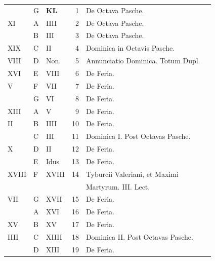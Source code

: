 \begin{center}
\begin{tabular}{l | l | l | r | l l}
\color{Red}  & G & \textbf{\color{Red} K\color{Blue}L} & 1 & \color{Red} De Octava Pasche. & \color{Red} \\
\color{Red} XI & \color{Red} A & \color{Red} IIII & 2 & \color{Red} De Octava Pasche. & \color{Red} \\
\color{Red}  & B & \color{Red} III & 3 & \color{Red} De Octava Pasche. \\
\color{Red} XIX & C & \color{Red} II & 4 & \color{Red} Dominica in Octavis Pasche. \\
\color{Red} VIII & D & \color{Red} Non. & 5 & Annunciatio Dominica. Totum Dupl. \\
\color{Red} XVI & E & \color{Red} VIII & 6 & De Feria. & \color{Red} \\
\color{Red} V & F & \color{Red} VII & 7 & De Feria. & \color{Red} \\
\color{Red}  & G & \color{Red} VI & 8 & De Feria. & \color{Red} \\
\color{Red} XIII & \color{Red} A & \color{Red} V & 9 & De Feria. & \color{Red} \\
\color{Red} II & B & \color{Red} IIII & 10 & De Feria. & \color{Red} \\
\color{Red}  & C & \color{Red} III & 11 & \color{Red} Dominica I. Post Octavas Pasche. \\
\color{Red} X & D & \color{Red} II & 12 & De Feria. & \color{Red} \\
\color{Red}  & E & \color{Red} Idus & 13 & De Feria. & \color{Red} \\
\color{Red} XVIII & F & \color{Red} XVIII & 14 & \multicolumn{2}{l}{Tyburcii Valeriani, et Maximi} \\
 & & & & \quad \color{Red} Martyrum. \color{black} III. Lect. \color{Red} \\
\color{Red} VII & G & \color{Red} XVII & 15 & De Feria. \\
\color{Red}  & \color{Red} A & \color{Red} XVI & 16 & De Feria. \\
\color{Red} XV & B & \color{Red} XV & 17 & De Feria. \\
\color{Red} IIII & C & \color{Red} XIIII & 18 & \color{Red} Dominica II. Post Octavas Pasche. & \color{Red} \\
\color{Red}  & D & \color{Red} XIII & 19 & De Feria. & \color{Red} \\

\end{tabular}
\end{center}
